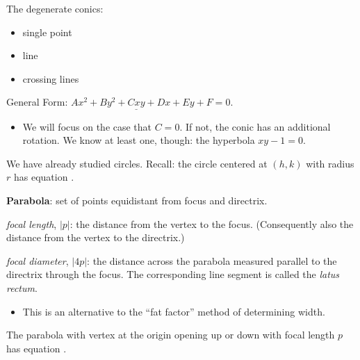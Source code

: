 \documentclass{amsbook}
\numberwithin{section}{chapter}
\numberwithin{equation}{chapter}
\newcommand{\drawgridxxyyb}[4]{
	\draw[thick,->] (#1,0) -- (#2,0) node[right] {$x$}; 
	\draw[thick, ->] (0,#3) -- (0,#4) node[above] {$y$};
}
\newcommand{\qi}[1]{\begin{itemize}\item #1 \end{itemize}}
\begin{document}
The degenerate conics:
\begin{itemize}
	\item single point
	\item line
	\item crossing lines
\end{itemize}

General Form: $Ax^2 + By^2+ \underline{Cxy} +Dx +Ey + F = 0$.

\qi{We will focus on the case that $C=0$. If not, the conic has an additional rotation. We know at least one, though: the hyperbola $xy-1=0$.}

We have already studied circles. Recall: the circle centered at $(h,k)$ with radius $r$ has equation .

\bigskip
{} \textbf{Parabola}: set of points equidistant from focus and directrix.



\textit{focal length}, $|p|$: the distance from the vertex to the focus. (Consequently also the distance from the vertex to the directrix.)

\textit{focal diameter}, $|4p|$: the distance across the parabola measured parallel to the directrix through the focus. The corresponding line segment is called the \textit{latus rectum}.

\qi{This is an alternative to the ``fat factor'' method of determining width.}

The parabola with vertex at the origin opening up or down with focal length $p$ has equation .
\end{document}
